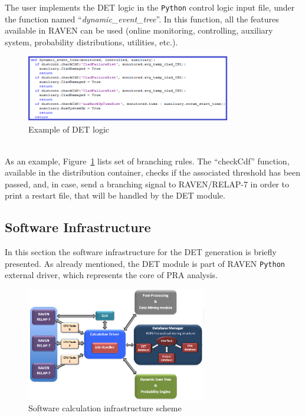 The user implements the DET logic in the \verb!Python! control logic input file, under the function named ``\emph{dynamic\_event\_tree}''. In this function, all the features available in RAVEN can be used (online monitoring, controlling, auxiliary system, probability distributions, utilities, etc.). 
\begin{figure}[h] 
  \centering
     \includegraphics[width=0.8\textwidth]{figures/BranchingLaws.png}
  \caption{Example of DET logic}
   \label{fig:DET_branchLaws}
\end{figure}
\\As an example, Figure~\ref{fig:DET_branchLaws} lists set of branching rules. The ``checkCdf'' function, available in the distribution container, checks if the associated threshold has been passed, and, in case, send a branching signal to RAVEN/RELAP-7 in order to print a restart file, that will be handled by the DET module. 
\subsection{Software Infrastructure} 
\label{sec:CPUInfrastructure}
In this section the software infrastructure for the DET generation is briefly presented. As already mentioned, the DET module is part of RAVEN \verb!Python! external driver, which represents the core of PRA analysis.
\begin{figure}[h] 
  \centering
     \includegraphics[width=0.70\textwidth]{figures/softwareCalcStructure.png}
  \caption{Software calculation infrastructure scheme}
   \label{fig:softwareInfrastructure}
\end{figure} 

